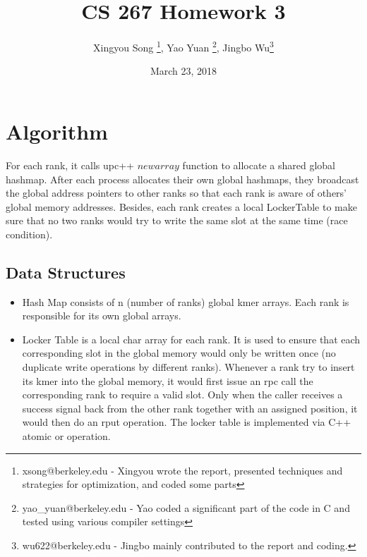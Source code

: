 \documentclass[12pt]{article}
\begin{document}
 
 

\title{CS 267 Homework 3}
\author{Xingyou Song \footnote{xsong@berkeley.edu - Xingyou wrote the report, presented techniques and strategies for optimization, and coded some parts}, Yao Yuan \footnote{yao\_yuan@berkeley.edu - Yao coded a significant part of the code in C and tested using various compiler settings}, Jingbo Wu\footnote{wu622@berkeley.edu - Jingbo mainly contributed to the report and coding.}} %
\date{March 23, 2018} 
\maketitle

\section{Algorithm}
For each rank, it calls upc++ $newarray$ function to allocate a shared global hashmap. After each process allocates their own global hashmaps, they broadcast the global address pointers to other ranks so that each rank is aware of others' global memory addresses. Besides, each rank creates a local LockerTable to make sure that no two ranks would try to write the same slot at the same time (race condition).

\subsection{Data Structures}
\begin{itemize}
\item Hash Map consists of n (number of ranks) global kmer arrays. Each rank is responsible for its own global arrays. 
\item Locker Table is a local char array for each rank. It is used to ensure that each corresponding slot in the global memory would only be written once (no duplicate write operations by different ranks). Whenever a rank try to insert its kmer into the global memory, it would first issue an rpc call the corresponding rank to require a valid slot. Only when the caller receives a success signal back from the other rank together with an assigned position, it would then do an rput operation. The locker table is implemented via C++ atomic or operation.
\end{itemize}
\end{document}
